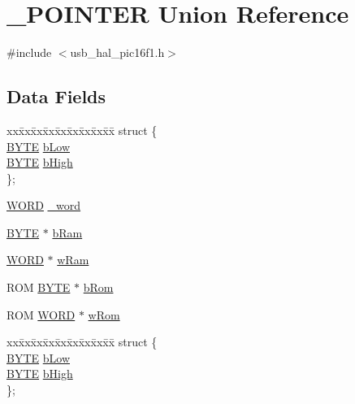 \hypertarget{union___p_o_i_n_t_e_r}{}\section{\+\_\+\+P\+O\+I\+N\+T\+E\+R Union Reference}
\label{union___p_o_i_n_t_e_r}


{\ttfamily \#include $<$usb\+\_\+hal\+\_\+pic16f1.\+h$>$}

\subsection*{Data Fields}
\begin{DoxyCompactItemize}
\item 
\begin{tabbing}
xx\=xx\=xx\=xx\=xx\=xx\=xx\=xx\=xx\=\kill
struct \{\\
\>\hyperlink{_generic_type_defs_8h_a4ae1dab0fb4b072a66584546209e7d58}{BYTE} \hyperlink{union___p_o_i_n_t_e_r_a072a7dd91588708091200278cf02b094}{bLow}\\
\>\hyperlink{_generic_type_defs_8h_a4ae1dab0fb4b072a66584546209e7d58}{BYTE} \hyperlink{union___p_o_i_n_t_e_r_a8e2d6813fd08f41226f10f65c05ffe7b}{bHigh}\\
\}; \\

\end{tabbing}\item 
\hyperlink{_generic_type_defs_8h_a2b0e863dadf920709ec53d9088ee7c91}{W\+O\+R\+D} \hyperlink{union___p_o_i_n_t_e_r_a6a5f159fcaca96aba991cf7298cc1083}{\+\_\+word}
\item 
\hyperlink{_generic_type_defs_8h_a4ae1dab0fb4b072a66584546209e7d58}{B\+Y\+T\+E} $\ast$ \hyperlink{union___p_o_i_n_t_e_r_ae2ae207314ea88e2dec151249e668c86}{b\+Ram}
\item 
\hyperlink{_generic_type_defs_8h_a2b0e863dadf920709ec53d9088ee7c91}{W\+O\+R\+D} $\ast$ \hyperlink{union___p_o_i_n_t_e_r_a7e771c6c6b7a63de1c58c40c0184262e}{w\+Ram}
\item 
R\+O\+M \hyperlink{_generic_type_defs_8h_a4ae1dab0fb4b072a66584546209e7d58}{B\+Y\+T\+E} $\ast$ \hyperlink{union___p_o_i_n_t_e_r_a2d27605a798ca63fe52222945ce5261a}{b\+Rom}
\item 
R\+O\+M \hyperlink{_generic_type_defs_8h_a2b0e863dadf920709ec53d9088ee7c91}{W\+O\+R\+D} $\ast$ \hyperlink{union___p_o_i_n_t_e_r_ae5e8843a13f42cbfef8a565d473a3782}{w\+Rom}
\item 
\begin{tabbing}
xx\=xx\=xx\=xx\=xx\=xx\=xx\=xx\=xx\=\kill
struct \{\\
\>\hyperlink{_generic_type_defs_8h_a4ae1dab0fb4b072a66584546209e7d58}{BYTE} \hyperlink{union___p_o_i_n_t_e_r_a072a7dd91588708091200278cf02b094}{bLow}\\
\>\hyperlink{_generic_type_defs_8h_a4ae1dab0fb4b072a66584546209e7d58}{BYTE} \hyperlink{union___p_o_i_n_t_e_r_a8e2d6813fd08f41226f10f65c05ffe7b}{bHigh}\\
\}; \\


\end{tabbing}
\end{DoxyCompactItemize}
